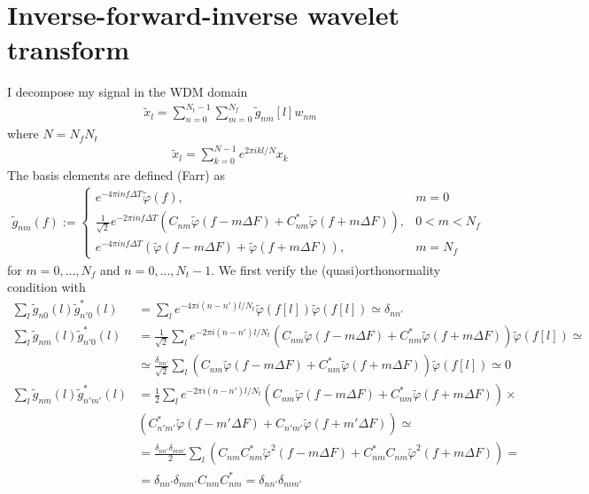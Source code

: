 \documentclass[%
 reprint,
superscriptaddress,
nofootinbib,
 amsmath,amssymb,
 aps,
colorlinks = true, 
linkcolor = blue, 
urlcolor = blue, 
citecolor = blue, 
anchorcolor = blue,
]{revtex4-2}
\begin{document}
\section{Inverse-forward-inverse wavelet transform}
I decompose my signal in the WDM domain
%
\begin{align}
\tilde x_l=\sum_{n=0}^{N_t-1}\sum_{m=0}^{N_f}\tilde g_{nm}[l] w_{nm}
\end{align}
%
where $N=N_fN_t$
%
\begin{align}
\tilde x_l=\sum_{k=0}^{N-1} e^{2\pi i k l/N}x_k
\end{align}
%
The basis elements are defined (Farr) as
%
\begin{align}
\tilde{g}_{n m}(f):= \begin{cases}
e^{-4\pi i n f \Delta T} \tilde{\varphi}(f), & m=0 \\
\frac{1}{\sqrt{2}}e^{-2 \pi i n f \Delta T}\left(C_{n m} \tilde{\varphi}(f-m \Delta F)+C_{n m}^* \tilde{\varphi}(f+m \Delta F)\right), & 0<m<N_f \\
e^{-4 \pi i n f \Delta T}\left(\tilde{\varphi}(f-m \Delta F)+\tilde{\varphi}(f+m \Delta F)\right), & m=N_f
\end{cases}
\end{align}
%
for $m=0,...,N_f$ and $n=0,...,N_t-1$. We first verify the (quasi)orthonormality condition with
%
\begin{align}
\sum_l \tilde{g}_{n 0}(l)\tilde{g}^*_{n' 0}(l)&=\sum_l e^{-4\pi i (n-n') l/N_t} \tilde{\varphi}(f[l])\tilde{\varphi}(f[l])\simeq\delta_{nn'}\nonumber\\
\sum_l \tilde{g}_{n m}(l)\tilde{g}^*_{n' 0}(l)&=\frac{1}{\sqrt{2}}\sum_l e^{-2\pi i (n-n') l/N_t} \left(C_{n m} \tilde{\varphi}(f-m \Delta F)+C_{n m}^* \tilde{\varphi}(f+m \Delta F)\right)\tilde{\varphi}(f[l])\simeq\nonumber\\
&\simeq\frac{\delta_{nn'}}{\sqrt{2}}\sum_l  \left(C_{n m} \tilde{\varphi}(f-m \Delta F)+C_{n m}^* \tilde{\varphi}(f+m \Delta F)\right)\tilde{\varphi}(f[l])\simeq 0\nonumber\\
\sum_l \tilde{g}_{n m}(l)\tilde{g}^*_{n' m'}(l)&=\frac{1}{2}\sum_l e^{-2\pi i (n-n') l/N_t} \left(C_{n m} \tilde{\varphi}(f-m \Delta F)+C_{n m}^* \tilde{\varphi}(f+m \Delta F)\right)\times \nonumber\\
&\left(C_{n' m'}^* \tilde{\varphi}(f-m' \Delta F)+C_{n' m'} \tilde{\varphi}(f+m' \Delta F)\right)\simeq\nonumber\\
&=\frac{\delta_{nn'}\delta_{mm'}}{2}\sum_l \left(C_{n m}C_{n m}^* \tilde{\varphi}^2(f-m \Delta F)+C_{n m}^*C_{n m} \tilde{\varphi}^2(f+m \Delta F)\right)=\nonumber\\
&=\delta_{nn'}\delta_{mm'}C_{n m}C_{n m}^*=\delta_{nn'}\delta_{mm'}
\end{align}
\end{document}
